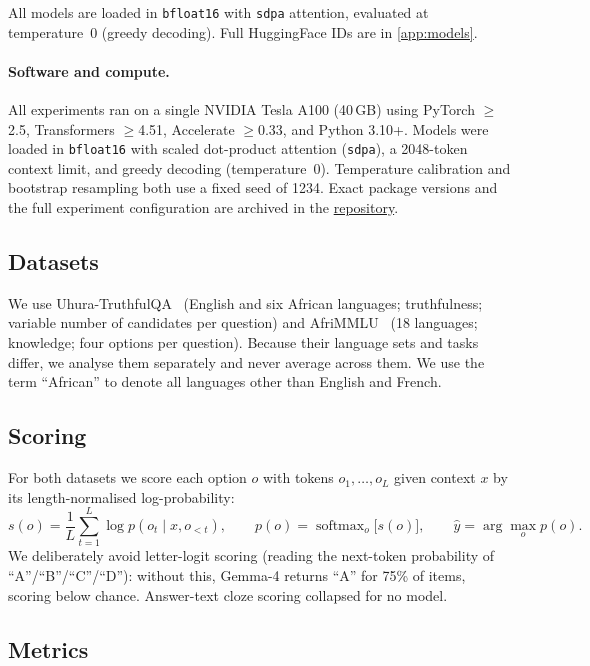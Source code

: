 \documentclass[11pt,a4paper]{article}
\begin{document}
All models are loaded in \texttt{bfloat16} with \texttt{sdpa} attention,
evaluated at temperature~0 (greedy decoding). Full HuggingFace IDs are in
\cref{app:models}.

\paragraph{Software and compute.}
All experiments ran on a single NVIDIA Tesla A100 (40\,GB) using
PyTorch $\geq$2.5, Transformers $\geq$4.51, Accelerate $\geq$0.33, and
Python 3.10+. Models were loaded in \texttt{bfloat16} with scaled
dot-product attention (\texttt{sdpa}), a 2048-token context limit, and
greedy decoding (temperature~0). Temperature calibration and bootstrap
resampling both use a fixed seed of 1234. Exact package versions and
the full experiment configuration are archived in the
\href{https://github.com/rexsimiloluwah/aims-team-apart-ai-safety-hackathon}{repository}.

\subsection{Datasets}

We use Uhura-TruthfulQA~\citep{bayes2024uhura} (English and six African
languages; truthfulness; variable number of candidates per question) and
AfriMMLU~\citep{adelani2024irokobench} (18 languages; knowledge; four options
per question). Because their language sets and tasks differ, we analyse them
separately and never average across them. We use the term ``African'' to denote
all languages other than English and French.

\subsection{Scoring}

For both datasets we score each option $o$ with tokens $o_1,\ldots,o_L$ given
context $x$ by its length-normalised log-probability:
\[
  s(o) = \frac{1}{L}\sum_{t=1}^{L} \log p(o_t \mid x, o_{<t}),
  \qquad
  p(o) = \operatorname{softmax}_o\bigl[s(o)\bigr],
  \qquad
  \hat{y} = \arg\max_o p(o).
\]
We deliberately avoid letter-logit scoring (reading the next-token probability
of ``A''/``B''/``C''/``D''): without this, Gemma-4 returns ``A'' for 75\% of
items, scoring below chance. Answer-text cloze scoring collapsed for no model.

\subsection{Metrics}
\end{document}
